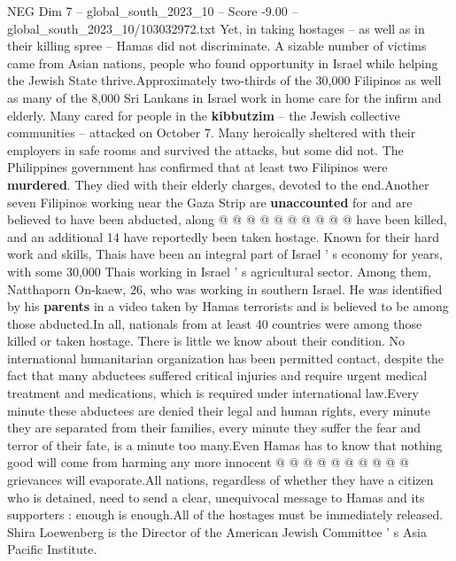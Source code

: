 \begin{textsample}{NEG Dim 7 – global\_south\_2023\_10 – Score -9.00 – global\_south\_2023\_10/103032972.txt}
Yet, in taking hostages -- as well as in their killing spree -- Hamas did not discriminate.
A sizable number of victims came from Asian nations, people who found opportunity in Israel while helping the Jewish State thrive.Approximately two-thirds of the 30,000 Filipinos as well as many of the 8,000 Sri Lankans in Israel work in home care for the infirm and elderly.
Many cared for people in the \textbf{kibbutzim} -- the Jewish collective communities -- attacked on October 7.
Many heroically sheltered with their employers in safe rooms and survived the attacks, but some did not.
The Philippines government has confirmed that at least two Filipinos were \textbf{murdered}.
They died with their elderly charges, devoted to the end.Another seven Filipinos working near the Gaza Strip are \textbf{unaccounted} for and are believed to have been abducted, along @ @ @ @ @ @ @ @ @ @ have been killed, and an additional 14 have reportedly been taken hostage.
Known for their hard work and skills, Thais have been an integral part of Israel ' s economy for years, with some 30,000 Thais working in Israel ' s agricultural sector.
Among them, Natthaporn On-kaew, 26, who was working in southern Israel.
He was identified by his \textbf{parents} in a video taken by Hamas terrorists and is believed to be among those abducted.In all, nationals from at least 40 countries were among those killed or taken hostage.
There is little we know about their condition.
No international humanitarian organization has been permitted contact, despite the fact that many abductees suffered critical injuries and require urgent medical treatment and medications, which is required under international law.Every minute these abductees are denied their legal and human rights, every minute they are separated from their families, every minute they suffer the fear and terror of their fate, is a minute too many.Even Hamas has to know that nothing good will come from harming any more innocent @ @ @ @ @ @ @ @ @ @ grievances will evaporate.All nations, regardless of whether they have a citizen who is detained, need to send a clear, unequivocal message to Hamas and its supporters : enough is enough.All of the hostages must be immediately released.
Shira Loewenberg is the Director of the American Jewish Committee ' s Asia Pacific Institute.

\end{textsample}
